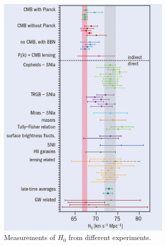 \begin{figure}[ht]
	\centering
	\includegraphics[width=0.75\textwidth]{plots/h0_tension_4x.jpeg}
	\caption{Measurements of $H_0$ from different experiments.}
	\label{fig:h0_tension}
\end{figure}









